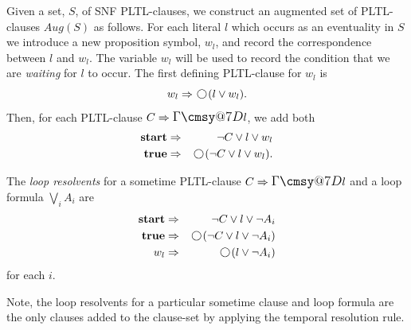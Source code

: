 \documentclass[nohyperref]{acmtrans2f}
\makeatletter
\def\sometime{\mathord{\hbox{\large$\mathchar"0\cmsy@7D$}}}
\newcommand{\next}{\!\raisebox{-.2ex}{ %
                        \mbox{\unitlength=0.9ex
                        \begin{picture}(2,2)
                        \linethickness{0.06ex}
                        \put(1,1){\circle{2}} %
                        \end{picture}}}       %
                        \,}
\let\imp=\Rightarrow
\def\ltrue{\hbox{\rm\bf true}}
\def\lstart{\hbox{\rm\bf start}}
\makeatother
\begin{document}
\begin{subdefn}
Given a set, $S$, of SNF PLTL-clauses, we construct an augmented set of PLTL-clauses
$Aug(S)$ as follows. For each literal $l$ which occurs as an
eventuality in $S$ we introduce a new proposition symbol, $w_l$, and record
the correspondence between $l$ and $w_l$. The variable $w_l$ will be
used to record the condition that we are {\em waiting\/} for $l$ to
occur. The first defining PLTL-clause for $w_l$ is
%
\begin{equation}
w_l \imp \next (l \lor w_l). \label{wl1}
\end{equation}
%
Then, for each PLTL-clause $C \imp \sometime l$, we add both
\begin{eqnarray} 
\lstart & \imp & \neg C \lor l \lor w_l \label{wl2} \\
\ltrue  & \imp & \next(\neg C \lor l \lor w_l) \label{wl3}.
\end{eqnarray}
%
\end{subdefn}

\begin{subdefn}
The {\em loop resolvents} for a sometime PLTL-clause $C \imp \sometime l$ and a
loop formula $\bigvee_i A_i$ are
\begin{eqnarray}
\lstart & \imp & \neg C \lor l \lor \neg A_i  \label{wl4}\\ 
\ltrue & \imp & \next( \neg C \lor l \lor \neg A_i) \label{wl5}\\ 
w_l & \imp & \next(l \lor \neg A_i) \label{wl6} 
\end{eqnarray}
for each $i$.
\end{subdefn}
Note, the loop resolvents for a particular sometime clause and loop formula
are the only clauses added to the clause-set by applying the temporal
resolution rule. 
\end{document}

